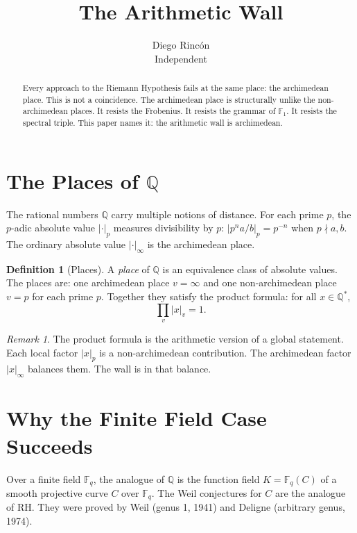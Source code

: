 \documentclass[12pt]{article}
\title{The Arithmetic Wall}
\author{Diego Rinc\'on\\
\small Independent}
\date{}
\theoremstyle{definition}
\newtheorem{definition}[theorem]{Definition}
\theoremstyle{remark}
\newtheorem{remark}[theorem]{Remark}
\begin{document}
\maketitle

\begin{abstract}
Every approach to the Riemann Hypothesis fails at the same place:
the archimedean place.
This is not a coincidence.
The archimedean place is structurally unlike the non-archimedean places.
It resists the Frobenius.
It resists the grammar of $\mathbb{F}_1$.
It resists the spectral triple.
This paper names it: the arithmetic wall is archimedean.
\end{abstract}

\section{The Places of $\mathbb{Q}$}

The rational numbers $\mathbb{Q}$ carry multiple notions of distance.
For each prime $p$, the $p$-adic absolute value $|\cdot|_p$
measures divisibility by $p$: $|p^n a/b|_p = p^{-n}$
when $p \nmid a, b$.
The ordinary absolute value $|\cdot|_\infty$
is the archimedean place.

\begin{definition}[Places]
A \emph{place} of $\mathbb{Q}$ is an equivalence class of absolute values.
The places are: one archimedean place $v = \infty$
and one non-archimedean place $v = p$ for each prime $p$.
Together they satisfy the product formula:
for all $x \in \mathbb{Q}^*$,
$$\prod_v |x|_v = 1.$$
\end{definition}

\begin{remark}
The product formula is the arithmetic version of a global statement.
Each local factor $|x|_p$ is a non-archimedean contribution.
The archimedean factor $|x|_\infty$ balances them.
The wall is in that balance.
\end{remark}

\section{Why the Finite Field Case Succeeds}

Over a finite field $\mathbb{F}_q$, the analogue of $\mathbb{Q}$ is the function field
$K = \mathbb{F}_q(C)$ of a smooth projective curve $C$ over $\mathbb{F}_q$.
The Weil conjectures for $C$ are the analogue of RH.
They were proved by Weil (genus 1, 1941) and Deligne (arbitrary genus, 1974).
\end{document}
